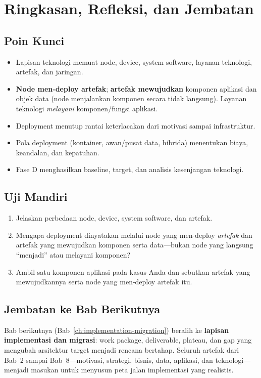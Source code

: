 \section{Ringkasan, Refleksi, dan Jembatan}

\subsection*{Poin Kunci}
\begin{itemize}
  \item Lapisan teknologi memuat node, device, system software, layanan teknologi,
        artefak, dan jaringan.
  \item \textbf{Node men-deploy artefak}; \textbf{artefak mewujudkan} komponen
        aplikasi dan objek data (node menjalankan komponen secara tidak langsung).
        Layanan teknologi \emph{melayani} komponen/fungsi aplikasi.
  \item Deployment menutup rantai keterlacakan dari motivasi sampai infrastruktur.
  \item Pola deployment (kontainer, awan/pusat data, hibrida) menentukan biaya,
        keandalan, dan kepatuhan.
  \item Fase D menghasilkan baseline, target, dan analisis kesenjangan teknologi.
\end{itemize}

\subsection*{Uji Mandiri}
\begin{enumerate}
  \item Jelaskan perbedaan node, device, system software, dan artefak.
  \item Mengapa deployment dinyatakan melalui node yang men-deploy \emph{artefak}
        dan artefak yang mewujudkan komponen serta data---bukan node yang langsung
        ``menjadi'' atau melayani komponen?
  \item Ambil satu komponen aplikasi pada kasus Anda dan sebutkan artefak yang
        mewujudkannya serta node yang men-deploy artefak itu.
\end{enumerate}

\subsection*{Jembatan ke Bab Berikutnya}
Bab berikutnya (Bab~\ref{ch:implementation-migration}) beralih ke \textbf{lapisan
implementasi dan migrasi}: work package, deliverable, plateau, dan gap yang
mengubah arsitektur target menjadi rencana bertahap. Seluruh artefak dari Bab~2 sampai Bab~8---motivasi, strategi, bisnis,
data, aplikasi, dan teknologi---menjadi masukan untuk menyusun peta jalan
implementasi yang realistis.

